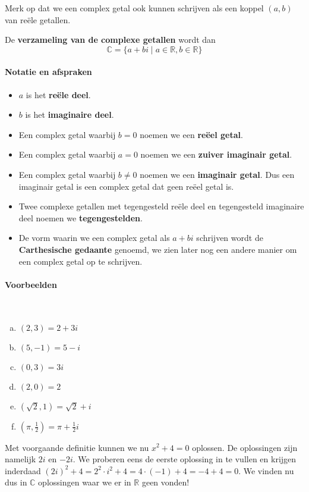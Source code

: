 \documentclass[12pt,twoside]{article}
\begin{document}
Merk op dat we een complex getal ook kunnen schrijven als een koppel $(a,b)$ van reële getallen.

De {\bf verzameling van de complexe getallen} wordt dan
$$\mathbb{C}=\{ a + bi \;|\; a\in\mathbb{R}, b\in\mathbb{R}\}$$

\paragraph*{Notatie en afspraken}
\begin{itemize}
  \item $a$ is het {\bf reële deel}.
  \item $b$ is het {\bf imaginaire deel}.
  \item Een complex getal waarbij $b=0$ noemen we een {\bf reëel getal}.
  \item Een complex getal waarbij $a=0$ noemen we een {\bf zuiver imaginair getal}.
  \item Een complex getal waarbij $b\neq 0$ noemen we een {\bf imaginair getal}. Dus een imaginair getal is een complex getal dat geen reëel getal is.
  \item Twee complexe getallen met tegengesteld reële deel en tegengesteld imaginaire deel noemen we {\bf tegengestelden}.
  \item De vorm waarin we een complex getal als $a+bi$ schrijven wordt de {\bf Carthesische gedaante} genoemd, we zien later nog een andere manier om een complex getal op te schrijven.
\end{itemize}

\paragraph*{Voorbeelden}\mbox{}\\
\begin{multicols}{2}
\begin{enumerate}[(a)]
  \item $(2,3)=2+3i$
  \item $(5,-1)=5-i$
  \item $(0,3)=3i$
  \item $(2,0)=2$
  \item $(\sqrt{2},1)=\sqrt{2}+i$
  \item $(\pi, \frac{1}{2})=\pi+\frac{1}{2}i$
\end{enumerate}
\end{multicols}

Met voorgaande definitie kunnen we nu $x^2+4=0$ oplossen. De oplossingen zijn namelijk $2i$ en $-2i$. We proberen eens de eerste oplossing in te vullen en krijgen inderdaad $(2i)^2+4 = 2^2\cdot i^2 + 4 = 4\cdot(-1) + 4 = -4 + 4 = 0$. We vinden nu dus in $\mathbb{C}$ oplossingen waar we er in $\mathbb{R}$ geen vonden!
\end{document}
